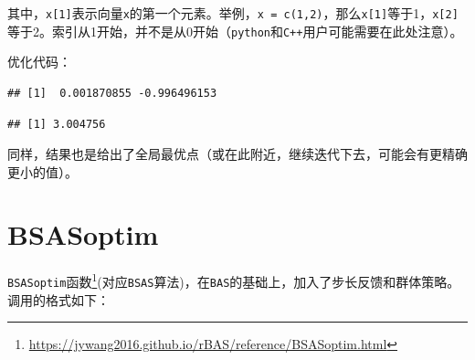 \documentclass[]{ctexbook}
\newenvironment{Shaded}{\begin{snugshade}}{\end{snugshade}}
\newcommand{\KeywordTok}[1]{\textcolor[rgb]{0.13,0.29,0.53}{\textbf{#1}}}
\newcommand{\DataTypeTok}[1]{\textcolor[rgb]{0.13,0.29,0.53}{#1}}
\newcommand{\DecValTok}[1]{\textcolor[rgb]{0.00,0.00,0.81}{#1}}
\newcommand{\StringTok}[1]{\textcolor[rgb]{0.31,0.60,0.02}{#1}}
\newcommand{\OtherTok}[1]{\textcolor[rgb]{0.56,0.35,0.01}{#1}}
\newcommand{\OperatorTok}[1]{\textcolor[rgb]{0.81,0.36,0.00}{\textbf{#1}}}
\newcommand{\NormalTok}[1]{#1}
\renewcommand{\href}[2]{#2\footnote{\url{#1}}}
\theoremstyle{definition}
\theoremstyle{definition}
\theoremstyle{definition}
\theoremstyle{remark}
\begin{document}
其中，\texttt{x{[}1{]}}表示向量\texttt{x}的第一个元素。举例，\texttt{x\ =\ c(1,2)}，那么\texttt{x{[}1{]}}等于1，\texttt{x{[}2{]}}等于2。索引从1开始，并不是从0开始（\texttt{python}和\texttt{C++}用户可能需要在此处注意）。

优化代码：

\begin{Shaded}
\end{Shaded}

\begin{verbatim}
## [1]  0.001870855 -0.996496153
\end{verbatim}

\begin{Shaded}
\end{Shaded}

\begin{verbatim}
## [1] 3.004756
\end{verbatim}

同样，结果也是给出了全局最优点（或在此附近，继续迭代下去，可能会有更精确更小的值）。

\section{BSASoptim}\label{bsasoptim}

\href{https://jywang2016.github.io/rBAS/reference/BSASoptim.html}{\texttt{BSASoptim}函数}(对应\texttt{BSAS}算法)，在\texttt{BAS}的基础上，加入了步长反馈和群体策略。调用的格式如下：
\end{document}
